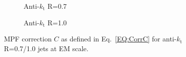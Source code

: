 \begin{figure}[!ht]
  \centering
  \begin{subfigure}{.5\textwidth}
    \centering
    \caption{Anti-$k_\mathrm{t}$ R=0.7}
  \end{subfigure}%
  \begin{subfigure}{.5\textwidth}  \centering
    \caption{Anti-$k_\mathrm{t}$ R=1.0}
  \end{subfigure}
  \caption[MPF Correction $C$ for anti-$k_\mathrm{t}$ R=0.7/1.0 jets]
{\small MPF correction $C$ as defined in Eq.~\ref{EQ:CorrC} for anti-$k_\mathrm{t}$ R=0.7/1.0 jets at EM scale.  }
  \label{Fig:TopoCorr_7-10}
\end{figure}


